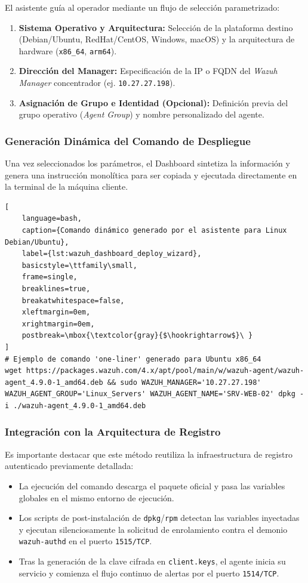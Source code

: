 El asistente guía al operador mediante un flujo de selección parametrizado:
\begin{enumerate}
    \item \textbf{Sistema Operativo y Arquitectura:} Selección de la plataforma destino (Debian/Ubuntu, RedHat/CentOS, Windows, macOS) y la arquitectura de hardware (\texttt{x86\_64}, \texttt{arm64}).
    \item \textbf{Dirección del Manager:} Especificación de la IP o FQDN del \textit{Wazuh Manager} concentrador (ej. \texttt{10.27.27.198}).
    \item \textbf{Asignación de Grupo e Identidad (Opcional):} Definición previa del grupo operativo (\textit{Agent Group}) y nombre personalizado del agente.
\end{enumerate}

\subsubsection{Generación Dinámica del Comando de Despliegue}
Una vez seleccionados los parámetros, el Dashboard sintetiza la información y genera una instrucción monolítica para ser copiada y ejecutada directamente en la terminal de la máquina cliente.

\begin{lstlisting}[
    language=bash,
    caption={Comando dinámico generado por el asistente para Linux Debian/Ubuntu},
    label={lst:wazuh_dashboard_deploy_wizard},
    basicstyle=\ttfamily\small,
    frame=single,
    breaklines=true,
    breakatwhitespace=false,
    xleftmargin=0em,
    xrightmargin=0em,
    postbreak=\mbox{\textcolor{gray}{$\hookrightarrow$}\ }
]
# Ejemplo de comando 'one-liner' generado para Ubuntu x86_64
wget https://packages.wazuh.com/4.x/apt/pool/main/w/wazuh-agent/wazuh-agent_4.9.0-1_amd64.deb && sudo WAZUH_MANAGER='10.27.27.198' WAZUH_AGENT_GROUP='Linux_Servers' WAZUH_AGENT_NAME='SRV-WEB-02' dpkg -i ./wazuh-agent_4.9.0-1_amd64.deb
\end{lstlisting}

\subsubsection{Integración con la Arquitectura de Registro}
Es importante destacar que este método reutiliza la infraestructura de registro autenticado previamente detallada:
\begin{itemize}
    \item La ejecución del comando descarga el paquete oficial y pasa las variables globales en el mismo entorno de ejecución.
    \item Los scripts de post-instalación de \texttt{dpkg}/\texttt{rpm} detectan las variables inyectadas y ejecutan silenciosamente la solicitud de enrolamiento contra el demonio \texttt{wazuh-authd} en el puerto \texttt{1515/TCP}.
    \item Tras la generación de la clave cifrada en \texttt{client.keys}, el agente inicia su servicio y comienza el flujo continuo de alertas por el puerto \texttt{1514/TCP}.
\end{itemize}


